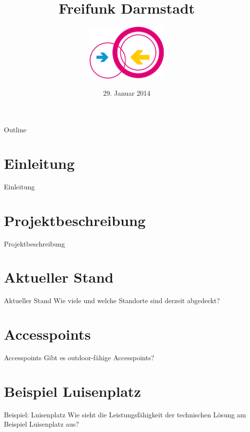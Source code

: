 \documentclass{beamer}
\title{Freifunk Darmstadt}
\author{\includegraphics[width=4cm]{images/logo}}
\date{29. Januar 2014}
\begin{document}
\begin{frame}
\maketitle
\end{frame}


\begin{frame}{Outline}
\tableofcontents
\end{frame}

\section{Einleitung}
\begin{frame}{Einleitung}
\end{frame}

\section{Projektbeschreibung}
\begin{frame}{Projektbeschreibung}
\end{frame}

\section{Aktueller Stand}
\begin{frame}{Aktueller Stand}
Wie viele und welche Standorte sind derzeit abgedeckt?
\end{frame}

\section{Accesspoints}
\begin{frame}{Accesspoints}
Gibt es outdoor-fähige Accesspoints?
\end{frame}

\section{Beispiel Luisenplatz}
\begin{frame}{Beispiel: Luisenplatz}
Wie sieht die Leistungsfähigkeit der technischen Lösung am Beispiel Luisenplatz aus?
\end{frame}
\end{document}
